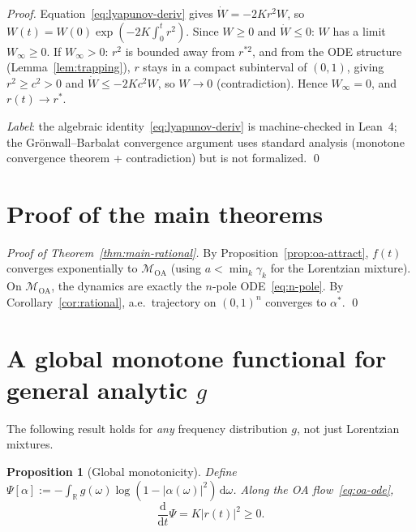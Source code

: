 \documentclass[11pt,a4paper]{article}
\newtheorem{proposition}[theorem]{Proposition}
\theoremstyle{definition}
\newcommand{\R}{\mathbb{R}}
\begin{document}
\begin{proof}
Equation~\eqref{eq:lyapunov-deriv} gives $\dot{W} = -2Kr^2 W$, so $W(t) = W(0)\exp(-2K\int_0^t r^2)$. Since $W \geq 0$ and $\dot{W} \leq 0$: $W$ has a limit $W_\infty \geq 0$. If $W_\infty > 0$: $r^2$ is bounded away from $r^{*2}$, and from the ODE structure (Lemma~\ref{lem:trapping}), $r$ stays in a compact subinterval of $(0,1)$, giving $r^2 \geq c^2 > 0$ and $\dot{W} \leq -2Kc^2 W$, so $W \to 0$ (contradiction). Hence $W_\infty = 0$, and $r(t) \to r^*$.

\emph{Label}: the algebraic identity~\eqref{eq:lyapunov-deriv} is machine-checked in Lean~4; the Gr\"onwall--Barbalat convergence argument uses standard analysis (monotone convergence theorem + contradiction) but is not formalized. \qed
\end{proof}

\section{Proof of the main theorems}\label{sec:proofs}

\begin{proof}[Proof of Theorem~\ref{thm:main-rational}]
By Proposition~\ref{prop:oa-attract}, $f(t)$ converges exponentially to $\mathcal{M}_{\mathrm{OA}}$ (using $a < \min_k\gamma_k$ for the Lorentzian mixture). On $\mathcal{M}_{\mathrm{OA}}$, the dynamics are exactly the $n$-pole ODE~\eqref{eq:n-pole}. By Corollary~\ref{cor:rational}, a.e.\ trajectory on $(0,1)^n$ converges to $\alpha^*$. \qed
\end{proof}

\section{A global monotone functional for general analytic $g$}\label{sec:monotone}

The following result holds for \emph{any} frequency distribution $g$, not just Lorentzian mixtures.

\begin{proposition}[Global monotonicity]\label{prop:monotone}
Define $\Psi[\alpha] := -\int_\R g(\omega)\log(1 - |\alpha(\omega)|^2)\,\mathrm{d}\omega$. Along the OA flow~\eqref{eq:oa-ode},
\begin{equation}\label{eq:psi-dot}
\frac{\mathrm{d}}{\mathrm{d}t}\Psi = K|r(t)|^2 \geq 0.
\end{equation}
\end{proposition}
\end{document}
